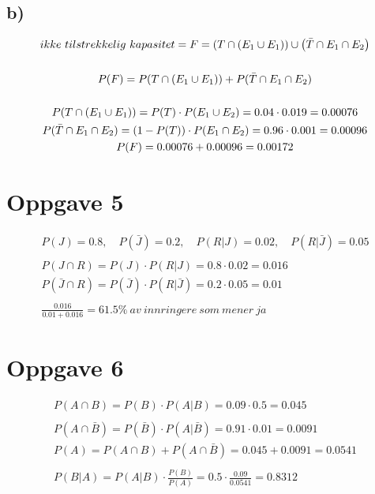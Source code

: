 \subsection*{b)}

\begin{gather*}
	ikke\ tilstrekkelig\ kapasitet = F = \left( T \cap \left( E_1 \cup E_1 \right) \right) \cup
	\left( \bar{T} \cap E_1 \cap E_2 \right) \\ \\
	P(F) = P(T \cap \left( E_1 \cup E_1 \right)) +
	P(\bar{T} \cap E_1 \cap E_2) \\ \\
	P(T \cap \left( E_1 \cup E_1 \right)) = P(T) \cdot P(E_1 \cup E_2) =
	0.04 \cdot 0.019 = 0.00076 \\
	P(\bar{T} \cap E_1 \cap E_2) = (1 - P(T)) \cdot P(E_1 \cap E_2) =
	0.96 \cdot 0.001 = 0.00096 \\
	P(F) = 0.00076 + 0.00096 = 0.00172 \\
\end{gather*}


\section*{Oppgave 5}

\begin{gather*}
	P(J) = 0.8, \quad
	P(\bar{J}) = 0.2, \quad
	P(R | J) = 0.02, \quad
	P(R | \bar{J}) = 0.05 \\ \\
	P(J \cap R) = P(J) \cdot P(R | J) = 0.8 \cdot 0.02 = 0.016 \\
	P(\bar{J} \cap R) = P(\bar{J}) \cdot P(R | \bar{J}) = 0.2 \cdot 0.05 = 0.01 \\ \\
	\frac{0.016}{0.01 + 0.016} = 61.5 \%\ av\ innringere\ som\ mener\ ja
\end{gather*}


\newpage


\section*{Oppgave 6}

\begin{gather*}
	P(A \cap B) = P(B) \cdot P(A | B) = 0.09 \cdot 0.5 = 0.045 \\ \\
	P(A \cap \bar B) = P(\bar B) \cdot P(A | \bar B) = 0.91 \cdot 0.01 = 0.0091 \\
	P(A) = P(A \cap B) + P(A \cap \bar B) = 0.045 + 0.0091 = 0.0541 \\ \\
	P(B | A) = P(A | B) \cdot \frac{P(B)}{P(A)} = 0.5 \cdot \frac{0.09}{0.0541} = 0.8312
\end{gather*}

